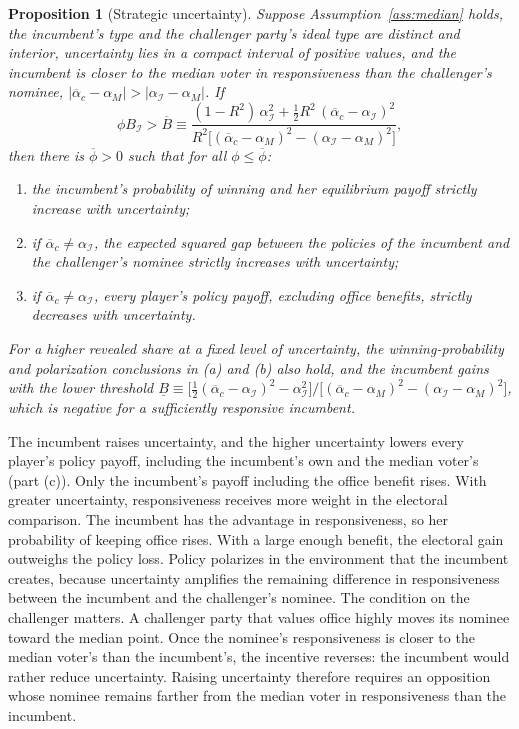 \documentclass[12pt,letterpaper]{article}
\newtheorem{proposition}{Proposition}
\begin{document}
\begin{proposition}[Strategic uncertainty]\label{prop:strategic}
Suppose Assumption~\ref{ass:median} holds, the incumbent's type and the challenger party's ideal type are distinct and interior, uncertainty lies in a compact interval of positive values, and the incumbent is closer to the median voter in responsiveness than the challenger's nominee, $|\overline{\alpha}_c-\alpha_M|>|\alpha_{\mathcal I}-\alpha_M|$. If
\[
\phi B_{\mathcal I}>\overline{B}\equiv\frac{(1-R^2)\,\alpha_{\mathcal I}^2+\tfrac12R^2\,(\overline{\alpha}_c-\alpha_{\mathcal I})^2}{R^2\big[(\overline{\alpha}_c-\alpha_M)^2-(\alpha_{\mathcal I}-\alpha_M)^2\big]},
\]
then there is $\overline{\phi}>0$ such that for all $\phi\le\overline{\phi}$:
\begin{enumerate}
  \item[(a)] the incumbent's probability of winning and her equilibrium payoff strictly increase with uncertainty;
  \item[(b)] if $\overline{\alpha}_c\ne\alpha_{\mathcal I}$, the expected squared gap between the policies of the incumbent and the challenger's nominee strictly increases with uncertainty;
  \item[(c)] if $\overline{\alpha}_c\ne\alpha_{\mathcal I}$, every player's policy payoff, excluding office benefits, strictly decreases with uncertainty.
\end{enumerate}
For a higher revealed share at a fixed level of uncertainty, the winning-probability and polarization conclusions in (a) and (b) also hold, and the incumbent gains with the lower threshold $\underline B\equiv\big[\tfrac12(\overline{\alpha}_c-\alpha_{\mathcal I})^2-\alpha_{\mathcal I}^2\big]\big/\big[(\overline{\alpha}_c-\alpha_M)^2-(\alpha_{\mathcal I}-\alpha_M)^2\big]$, which is negative for a sufficiently responsive incumbent.
\end{proposition}

The incumbent raises uncertainty, and the higher uncertainty lowers every player's policy payoff, including the incumbent's own and the median voter's (part (c)). Only the incumbent's payoff including the office benefit rises. With greater uncertainty, responsiveness receives more weight in the electoral comparison. The incumbent has the advantage in responsiveness, so her probability of keeping office rises. With a large enough benefit, the electoral gain outweighs the policy loss. Policy polarizes in the environment that the incumbent creates, because uncertainty amplifies the remaining difference in responsiveness between the incumbent and the challenger's nominee. The condition on the challenger matters. A challenger party that values office highly moves its nominee toward the median point. Once the nominee's responsiveness is closer to the median voter's than the incumbent's, the incentive reverses: the incumbent would rather reduce uncertainty. Raising uncertainty therefore requires an opposition whose nominee remains farther from the median voter in responsiveness than the incumbent.
\end{document}
